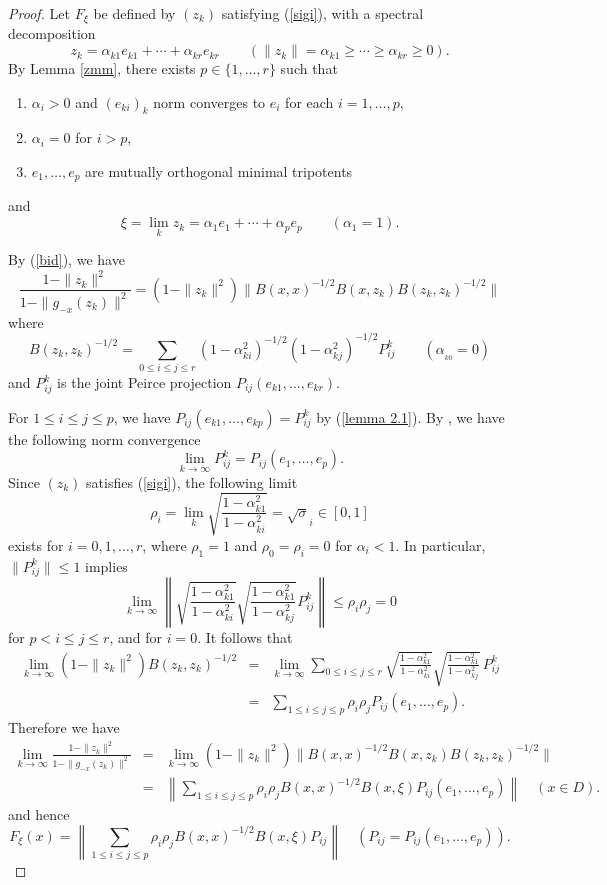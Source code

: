 \documentclass[12pt, twoside]{article}
\theoremstyle{definition}
\numberwithin{equation}{section}
\begin{document}
\begin{proof} Let $F_\xi$ be defined by  $(z_k)$ satisfying (\ref{sigi}), with
a spectral decomposition
$$z_k = \alpha_{k1}e_{k1} + \cdots + \alpha_{kr}e_{kr}
 \qquad (\|z_k\|=\alpha_{k1} \geq \cdots \geq \alpha_{kr} \geq 0).$$
By Lemma \ref{zmm},
 there exists $p\in \{1, \ldots, r\}$ such that
\begin{enumerate}
\item[(i)] $\alpha_i >0$ and $(e_{ki})_k$ norm converges to $e_i$ for each $i = 1, \ldots, p$,
\item[(ii)] $\alpha_i=0$ for $i >p$,
\item[(iii)]$e_1, \ldots, e_p$ are mutually orthogonal minimal tripotents
\end{enumerate}
and
$$\xi = \lim_k z_k = \alpha_1e_1 +\cdots +\alpha_p e_p \qquad (\alpha_1=1).$$

By (\ref{bid}), we have
$$ \frac{1-\|z_k\|^2}{1-\|g_{-x}(z_k)\|^2}= (1-\|z_k\|^2)\|B(x,x)^{-1/2}B(x,z_k)B(z_k,z_k)^{-1/2}\|$$
where
$$B(z_k,z_k)^{-1/2} = \sum_{0\leq i\leq j\leq r} (1-\alpha_{ki}^2)^{-1/2}(1-\alpha_{kj}^2)^{-1/2}P_{ij}^k \qquad (\alpha_{_{k0}}=0)$$
and $P_{ij}^k$ is the joint Peirce projection $P_{ij}(e_{k1}, \ldots, e_{kr})$.

For $1\leq i\leq j\leq p$, we have $P_{ij}(e_{k1}, \ldots, e_{kp}) = P_{ij}^k$ by (\ref{lemma 2.1}).
By \cite[Remark 5.9]{horo}, we have the following norm
convergence
$$\lim_{k\rightarrow \infty} P^k_{ij} = P_{ij}(e_1, \ldots, e_p).$$
Since $(z_k)$ satisfies (\ref{sigi}), the following limit
\begin{equation}\label{lambda}
\rho_i = \lim_k \sqrt{\frac{1-\alpha_{k1}^2}{1-\alpha_{ki}^2}} = \sqrt \sigma_i \in [0,1]
\end{equation}
exists for $i=0, 1, \ldots, r$, where $\rho_1 =1$ and $\rho_0=\rho_i =0$ for  $\alpha_i <1$.
In particular, $\|P_{ij}^k\|\leq 1$ implies
$$\lim_{k\rightarrow \infty}\left\|\sqrt{\frac{1-\alpha_{k1}^2}{1-\alpha_{ki}^2}}\sqrt{\frac{1-\alpha_{k1}^2}{1-\alpha_{kj}^2}}
P_{ij}^k\right\|\leq \rho_i\rho_j =0$$
for $p<i\leq j\leq r$, and for $i=0$.
It follows that
\begin{eqnarray*}
\lim_{k\rightarrow \infty} (1-\|z_k\|^2)B(z_k, z_k)^{-1/2}& = &
\lim_{k\rightarrow \infty} \sum_{0\leq i\leq j\leq r}
\sqrt{\frac{1-\alpha_{k1}^2}{1-\alpha_{ki}^2}}
\sqrt{\frac{1-\alpha_{k1}^2}{1-\alpha_{kj}^2}} \,P_{ij}^k\\
&= & \sum_{1\leq i\leq j\leq p}
\rho_i \rho_j P_{ij}(e_1, \ldots, e_p).
\end{eqnarray*}
Therefore we have
\begin{eqnarray*}
\lim_{k\rightarrow \infty} \frac{1-\|z_k\|^2}{1-\|g_{-x}(z_k)\|^2}  &=&
\lim_{k\rightarrow \infty} (1-\|z_k\|^2)\|B(x,x)^{-1/2}B(x,z_k)B(z_k,z_k)^{-1/2}\| \\
&= & \left\|\sum_{1\leq i\leq j\leq p}\rho_i\rho_jB(x,x)^{-1/2}B(x,\xi)P_{ij}(e_1, \ldots, e_p)\right\| \quad (x\in D).
\end{eqnarray*}
and hence $$F_\xi(x) = \left\|\sum_{1\leq i\leq j\leq p}\rho_i\rho_jB(x,x)^{-1/2}B(x,\xi)P_{ij}\right\|
\quad (P_{ij}=P_{ij}(e_1, \ldots, e_p)). $$
 \end{proof}
\end{document}
